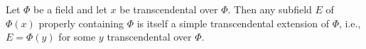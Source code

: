 Let $\Phi$ be a field and let $x$ be transcendental over $\Phi$. Then any subfield $E$ of $\Phi(x)$ properly containing $\Phi$ is itself a simple transcendental extension of $\Phi$, i.e., $E = \Phi(y)$ for some $y$ transcendental over $\Phi$.
